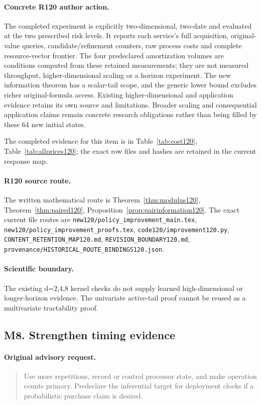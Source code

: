 \paragraph{Concrete R120 author action.}
The completed experiment is explicitly two-dimensional, two-date and evaluated at the two prescribed risk levels. It reports each service's full acquisition, original-value queries, candidate/refinement counters, raw process costs and complete resource-vector frontier. The four predeclared amortization volumes are conditions computed from these retained measurements; they are not measured throughput, higher-dimensional scaling or a horizon experiment. The new information theorem has a scalar-tail scope, and the generic lower bound excludes richer original-formula access. Existing higher-dimensional and application evidence retains its own source and limitations. Broader scaling and consequential application claims remain concrete research obligations rather than being filled by these 64 new initial states.

The completed evidence for this item is in Table~\ref{tab:cost120}, Table~\ref{tab:allprices120}; the exact row files and hashes are retained in the current response map.
\paragraph{R120 source route.}
The written mathematical route is Theorem~\ref{thm:modulus120}, Theorem~\ref{thm:paired120}, Proposition~\ref{prop:pairinformation120}. The exact current file routes are \nolinkurl{new120/policy_improvement_main.tex}, \nolinkurl{new120/policy_improvement_proofs.tex}, \nolinkurl{code120/improvement120.py}, \nolinkurl{CONTENT_RETENTION_MAP120.md}, \nolinkurl{REVISION_BOUNDARY120.md}, \nolinkurl{provenance/HISTORICAL_ROUTE_BINDINGS120.json}.
\paragraph{Scientific boundary.}
The existing d=2,4,8 kernel checks do not supply learned high-dimensional or longer-horizon evidence. The univariate active-tail proof cannot be reused as a multivariate tractability proof.

\subsection{M8. Strengthen timing evidence}
\label{response120:M8}
\paragraph{Original advisory request.}
\begin{quote}
Use more repetitions, record or control processor state, and make operation counts primary. Predeclare the inferential target for deployment clocks if a probabilistic purchase claim is desired.
\end{quote}
